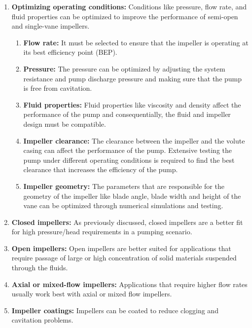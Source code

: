 \documentclass[11pt,a4paper]{scrartcl}
\begin{document}
\begin{enumerate}
        \item \textbf{Optimizing operating conditions:} Conditions like pressure, flow rate, and fluid properties can be optimized to improve the performance of semi-open and single-vane impellers. 
        
        \begin{enumerate}
        \item \textbf{Flow rate:} It must be selected to ensure that the impeller is operating at its best efficiency point (BEP). 
        \item \textbf{Pressure:} The pressure can be optimized by adjusting the system resistance and pump discharge pressure and making sure that the pump is free from cavitation.
        \item \textbf{Fluid properties:} Fluid properties like viscosity and density affect the  performance of the pump and consequentially, the fluid and impeller design must be compatible.  

        \item \textbf{Impeller clearance:} The clearance between the impeller and the volute casing can affect the performance of the pump. Extensive testing the pump under different operating conditions is required to find the best clearance that increases the efficiency of the pump.
        \item \textbf{Impeller geometry:} The parameters that are responsible for the geometry of the impeller like blade angle, blade width and height of the vane can be optimized through numerical simulations and testing.        
 
\end{enumerate}
        \item \textbf{Closed impellers:} As previously discussed, closed impellers are a better fit for high pressure/head requirements in a pumping scenario. 
        \item \textbf{Open impellers:} Open impellers are better suited for applications that require passage of large or high concentration of solid materials suspended through the fluids.

        \item \textbf{Axial or mixed-flow impellers:} Applications that require higher flow rates usually work best with axial or mixed flow impellers.
        \item \textbf{Impeller coatings:} Impellers can be coated to reduce clogging and cavitation problems. 
 
\end{enumerate}
\end{document}

